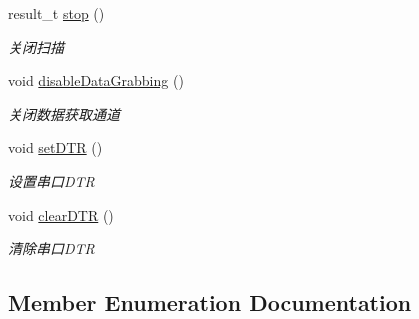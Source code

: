 \begin{DoxyCompactItemize}
\begin{DoxyCompactList}
\end{DoxyCompactList}\item 
result\+\_\+t \hyperlink{classydlidar_1_1_y_dlidar_driver_a7aa354e88eeb6984be4d18eae6367a0b}{stop} ()
\begin{DoxyCompactList}\small\item\em 关闭扫描 ~\newline
\end{DoxyCompactList}\item 
void \hyperlink{classydlidar_1_1_y_dlidar_driver_ae66565bee3cdb8b74698b691f2ab1e63}{disable\+Data\+Grabbing} ()\hypertarget{classydlidar_1_1_y_dlidar_driver_ae66565bee3cdb8b74698b691f2ab1e63}{}\label{classydlidar_1_1_y_dlidar_driver_ae66565bee3cdb8b74698b691f2ab1e63}

\begin{DoxyCompactList}\small\item\em 关闭数据获取通道 ~\newline
\end{DoxyCompactList}\item 
void \hyperlink{classydlidar_1_1_y_dlidar_driver_a88de43cf13058344fc83389cb9df7e21}{set\+D\+TR} ()\hypertarget{classydlidar_1_1_y_dlidar_driver_a88de43cf13058344fc83389cb9df7e21}{}\label{classydlidar_1_1_y_dlidar_driver_a88de43cf13058344fc83389cb9df7e21}

\begin{DoxyCompactList}\small\item\em 设置串口\+D\+TR ~\newline
\end{DoxyCompactList}\item 
void \hyperlink{classydlidar_1_1_y_dlidar_driver_a67fe00d7458cdb52b4160d745b8ecd32}{clear\+D\+TR} ()\hypertarget{classydlidar_1_1_y_dlidar_driver_a67fe00d7458cdb52b4160d745b8ecd32}{}\label{classydlidar_1_1_y_dlidar_driver_a67fe00d7458cdb52b4160d745b8ecd32}

\begin{DoxyCompactList}\small\item\em 清除串口\+D\+TR ~\newline
\end{DoxyCompactList}\end{DoxyCompactItemize}


\subsection{Member Enumeration Documentation}
